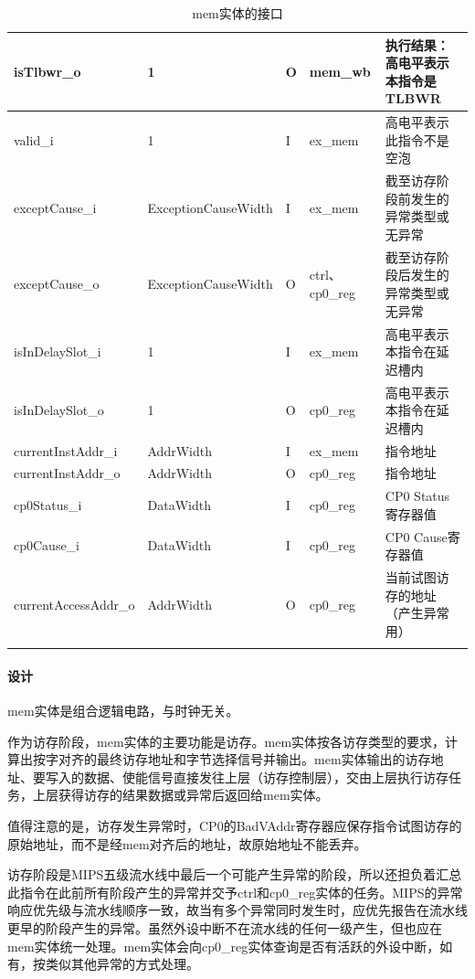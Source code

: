 \documentclass{article}
\begin{document}
\begin{spacing}{1.4}
\begin{longtable}{l|l|l|l|p{5cm}}
\hline isTlbwr\_o              & 1                      & O     & mem\_wb       & 执行结果：高电平表示本指令是TLBWR \\
\hline valid\_i                & 1                      & I     & ex\_mem       & 高电平表示此指令不是空泡 \\
\hline exceptCause\_i          & ExceptionCauseWidth    & I     & ex\_mem       & 截至访存阶段前发生的异常类型或无异常 \\
\hline exceptCause\_o          & ExceptionCauseWidth    & O     & ctrl、cp0\_reg& 截至访存阶段后发生的异常类型或无异常 \\
\hline isInDelaySlot\_i        & 1                      & I     & ex\_mem       & 高电平表示本指令在延迟槽内 \\
\hline isInDelaySlot\_o        & 1                      & O     & cp0\_reg      & 高电平表示本指令在延迟槽内 \\
\hline currentInstAddr\_i      & AddrWidth              & I     & ex\_mem       & 指令地址 \\
\hline currentInstAddr\_o      & AddrWidth              & O     & cp0\_reg          & 指令地址 \\
\hline cp0Status\_i            & DataWidth              & I     & cp0\_reg      & CP0 Status寄存器值 \\
\hline cp0Cause\_i             & DataWidth              & I     & cp0\_reg      & CP0 Cause寄存器值 \\
\hline currentAccessAddr\_o    & AddrWidth              & O     & cp0\_reg      & 当前试图访存的地址（产生异常用）\\
\hline
\caption{mem实体的接口}
\label{tb:mem-interface}
\end{longtable}

\paragraph{设计}\mbox{}

mem实体是组合逻辑电路，与时钟无关。

作为访存阶段，mem实体的主要功能是访存。mem实体按各访存类型的要求，计算出按字对齐的最终访存地址和字节选择信号并输出。mem实体输出的访存地址、要写入的数据、使能信号直接发往上层（访存控制层），交由上层执行访存任务，上层获得访存的结果数据或异常后返回给mem实体。

值得注意的是，访存发生异常时，CP0的BadVAddr寄存器应保存指令试图访存的原始地址，而不是经mem对齐后的地址，故原始地址不能丢弃。

访存阶段是MIPS五级流水线中最后一个可能产生异常的阶段，所以还担负着汇总此指令在此前所有阶段产生的异常并交予ctrl和cp0\_reg实体的任务。MIPS的异常响应优先级与流水线顺序一致，故当有多个异常同时发生时，应优先报告在流水线更早的阶段产生的异常。虽然外设中断不在流水线的任何一级产生，但也应在mem实体统一处理。mem实体会向cp0\_reg实体查询是否有活跃的外设中断，如有，按类似其他异常的方式处理。


\end{spacing}
\end{document}
